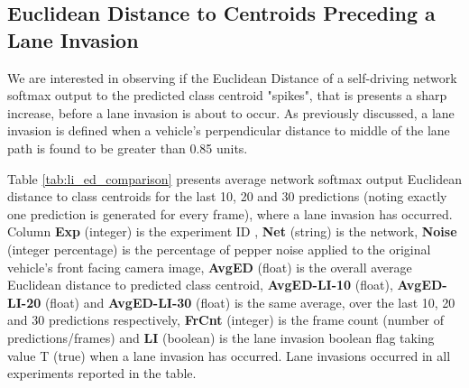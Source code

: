 \subsection{Euclidean Distance to Centroids Preceding a Lane Invasion}
\label{res:ed_centroids_preceding_lane_invasion}

We are interested in observing if the Euclidean Distance of a self-driving network softmax output to the predicted class centroid "spikes", that is presents a sharp increase, before a lane invasion is about to occur. As previously discussed, a lane invasion is defined when a vehicle's perpendicular distance to middle of the lane path is found to be greater than 0.85 units. 

Table \ref{tab:li_ed_comparison} presents average network softmax output Euclidean distance to class centroids for the last 10, 20 and 30 predictions (noting exactly one prediction is generated for every frame), where a lane invasion has occurred. Column \textbf{Exp} (integer) is the experiment ID , \textbf{Net} (string) is the network, \textbf{Noise} (integer percentage) is the percentage of pepper noise applied to the original vehicle's front facing camera image, \textbf{AvgED} (float) is the overall average Euclidean distance to predicted class centroid, \textbf{AvgED-LI-10} (float), \textbf{AvgED-LI-20} (float)  and \textbf{AvgED-LI-30} (float) is the same average, over the last 10, 20 and 30 predictions respectively, \textbf{FrCnt} (integer) is the frame count (number of predictions/frames) and \textbf{LI} (boolean) is the lane invasion boolean flag taking value T (true) when a lane invasion has occurred. Lane invasions occurred in all experiments reported in the table.


